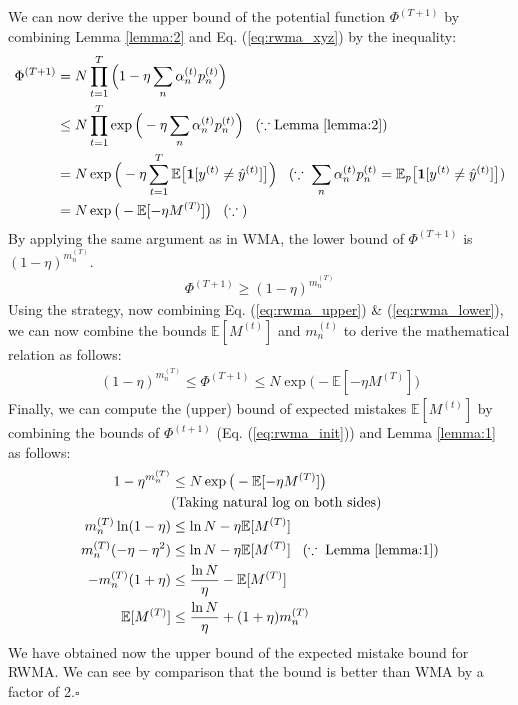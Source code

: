 \documentclass[11pt]{article}
\newcommand*{\QED}{\hfill\ensuremath{\square}}
\begin{document}
{We can now derive the upper bound of the potential function $\Phi^{(T+1)}$ by combining Lemma \ref{lemma:2} and Eq. (\ref{eq:rwma_xyz}) by the inequality:
\begin{align}
    \Phi^{(T+1)}&=N\prod_{t=1}^{T}\Big(1-\eta\sum_n\alpha_n^{(t)}p_n^{(t)}\Big)\nonumber\\
    &\leq N\prod_{t=1}^T\exp{\Big(-\eta\sum_n\alpha_n^{(t)}p_n^{(t)}\Big)}\;\;\;(\because \text{Lemma}\;\ref{lemma:2})\nonumber\\
    &=N\exp{\Big(-\eta\sum_{t=1}^{T}\mathbb{E}\big[\textbf{1}[y^{(t)}\neq\hat{y}^{(t)}]\big]\Big)}\;\;\;(\because\;\sum_n\alpha_n^{(t)}p_n^{(t)}=\mathbb{E}_p\big[\textbf{1}[y^{(t)}\neq\hat{y}^{(t)}]\big])\nonumber\\
    &=N\exp{\big(-\mathbb{E}[-\eta M^{(T)}]\big)}\;\;\;(\because\;)\label{eq:rwma_upper}
\end{align}
By applying the same argument as in WMA, the lower bound of $\Phi^{(T+1)}$ is $(1-\eta)^{m_n^{(T)}}$.
\begin{align}
    \Phi^{(T+1)}\geq(1-\eta)^{m_n^{(T)}}\label{eq:rwma_lower}
\end{align}
Using the strategy, now combining Eq. (\ref{eq:rwma_upper}) \& (\ref{eq:rwma_lower}), we can now combine the bounds $\mathbb{E}[M^{(t)}]$ and $m_n^{(t)}$ to derive the mathematical relation as follows:
\begin{align}
    (1-\eta)^{m_n^{(T)}}\leq \Phi^{(T+1)} \leq N\exp{\big(-\mathbb{E}[-\eta M^{(T)}]\big)}\label{eq:rwma_init}
\end{align}
Finally, we can compute the (upper) bound of expected mistakes $\mathbb{E}[M^{(t)}]$ by combining the bounds of $\Phi^{(t+1)}$ (Eq. (\ref{eq:rwma_init})) and Lemma \ref{lemma:1} as follows:
\begin{align*}
    {1-\eta}^{m_n^{(T)}} &\leq N\exp{\big(-\mathbb{E}[-\eta M^{(T)}]\big)}\\
    &\text{(Taking natural log on both sides)} \\
    m_n^{(T)}\ln(1-\eta) &\leq \ln N - \eta\mathbb{E}[M^{(T)}]\\
    m_n^{(T)}(-\eta-\eta^2)&\leq \ln N - \eta\mathbb{E}[M^{(T)}] \;\;\;(\because\; \text{Lemma}\;\ref{lemma:1})\\
    -m_n^{(T)}(1+\eta)&\leq\frac{\ln N}{\eta} - \mathbb{E}[M^{(T)}]\\
    \mathbb{E}[M^{(T)}]&\leq \frac{\ln N}{\eta} +  (1+\eta)m_n^{(T)}
\end{align*}
We have obtained now the upper bound of the expected mistake bound for RWMA. We can see by comparison that the bound is better than WMA by a factor of 2.\QED
}
\end{document}
